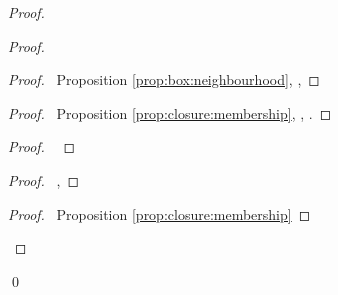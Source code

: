 \begin{proof}
\begin{proof}
\begin{proof}
      \pf\ Proposition \ref{prop:box:neighbourhood}, , 
    \end{proof}
    \begin{proof}
      \pf\ Proposition \ref{prop:closure:membership}, , .
    \end{proof}
    \begin{proof}
      \pf\ 
    \end{proof}
    \begin{proof}
      \pf\ , 
    \end{proof}
    \qedstep
    \begin{proof}
      \pf\ Proposition \ref{prop:closure:membership}
    \end{proof}
  \end{proof}
  \qed
\end{proof}
